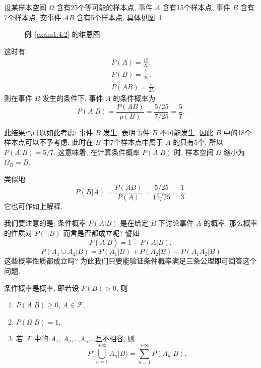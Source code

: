 \begin{example}\label{exam1.4.2}
  设某样本空间 $\Omega$ 含有25个等可能的样本点,
  事件 $A$ 含有15个样本点,
  事件 $B$ 含有7个样本点,
  交事件 $AB$ 含有5个样本点,
  具体见图~\ref{fig1.4.1}.

  \begin{figure}
    \centering
    \caption{例~\ref{exam1.4.2} 的维恩图.}\label{fig1.4.1}
  \end{figure}

  这时有
  \begin{align*}
    & P(A) = \frac{15}{25},\\
    & P(B) = \frac{7}{25},\\
    & P(AB) = \frac{5}{25}.
  \end{align*}
  则在事件 $B$ 发生的条件下,
  事件 $A$ 的条件概率为
  \[
    P (A|B) = \frac{P(AB)}{p(B)} = \frac{5/25}{7/25} = \frac{5}{7}.
  \]

  此结果也可以如此考虑:
  事件 $B$ 发生,
  表明事件 $\overline{B}$ 不可能发生,
  因此 $\overline{B}$ 中的18个样本点可以不予考虑.
  此时在 $B$ 中7个样本点中属于 $A$ 的只有5个,
  所以 $P(A|B) = 5/7$.
  这意味着,
  在计算条件概率 $P(A|B)$ 时,
  样本空间 $\Omega$ 缩小为 $\Omega_B = B$.

  类似地
  \[
    P (B|A) = \frac{P(AB)}{P(A)} = \frac{5/25}{15/25} = \frac{1}{3}.
  \]
  它也可作如上解释.
\end{example}

我们要注意的是:
条件概率 $P(A|B)$ 是在给定 $B$ 下讨论事件 $A$ 的概率,
那么概率的性质对 $P(\cdot|B)$ 而言是否都成立呢?
譬如
\[
  P (\overline{A} | B) = 1 - P(A|B),
\]
\[
  P(A_1 \cup A_2 | B) = P(A_1 | B) + P(A_2 | B) - P(A_1 A_2 | B)
\]
这些概率性质都成立吗?
为此我们只要能验证条件概率满足三条公理即可回答这个问题.

\begin{property}
  条件概率是概率,
  即若设 $P(B) > 0$,
  则
  \begin{enumerate}
    \item $P(A|B) \ge 0$, $A \in \mathscr{F}$,
    \item $P(\Omega|B) = 1$,
    \item 若 $\mathscr{F}$ 中的 $A_1$, $A_2$,\dots,$A_n$,\dots 互不相容,
    则
    \[
      P \biggl( \bigcup _{n=1} ^{+\infty} A_n | B \biggr) = \sum_{n=1} ^{+\infty} P (A_n | B).
    \]
  \end{enumerate}
\end{property}

